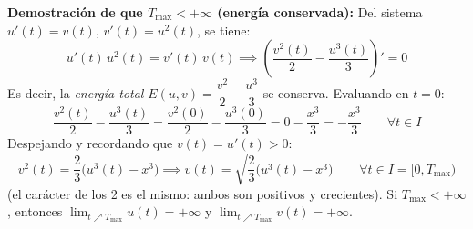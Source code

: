 {    \begin{center}
    \end{center}

    \medskip

    \textbf{Demostración de que $T_{\max} < +\infty$ (energía conservada):} Del sistema $u'(t) = v(t)$, $v'(t) = u^2(t)$, se tiene:
    \[
        u'(t)\, u^2(t) = v'(t)\, v(t) \implies \left(\frac{v^2(t)}{2} - \frac{u^3(t)}{3}\right)' = 0
    \]
    Es decir, la \textit{energía total} $E(u,v) = \dfrac{v^2}{2} - \dfrac{u^3}{3}$ se conserva. Evaluando en $t=0$:
    \[
        \frac{v^2(t)}{2} - \frac{u^3(t)}{3} = \frac{v^2(0)}{2} - \frac{u^3(0)}{3} = 0 - \frac{x^3}{3} = -\frac{x^3}{3} \qquad \forall t \in I
    \]
    Despejando y recordando que $v(t) = u'(t) > 0$:
    \[
        v^2(t) = \frac{2}{3}\bigl(u^3(t) - x^3\bigr) \implies v(t) = \sqrt{\frac{2}{3}\bigl(u^3(t) - x^3\bigr)} \qquad \forall t \in I = [0, T_{\max})
    \]
    (el carácter de los 2 es el mismo: ambos son positivos y crecientes). Si $T_{\max} < +\infty$, entonces $\lim_{t \nearrow T_{\max}} u(t) = +\infty$ y $\lim_{t \nearrow T_{\max}} v(t) = +\infty$.

    \medskip

}
